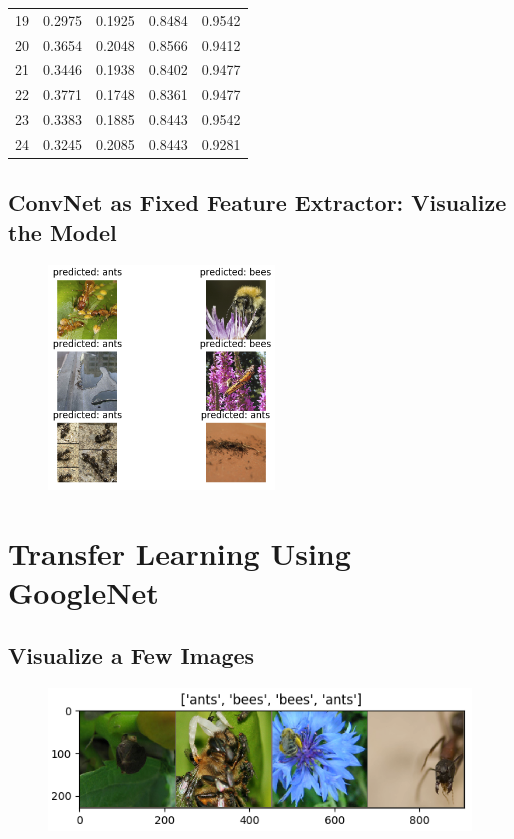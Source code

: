 \documentclass[12pt]{article}
\begin{document}
\begin{table}[h]
{\begin{tabular}{lcccc}
					19    & 0.2975     & 0.1925           & 0.8484         & 0.9542              \\
					20    & 0.3654     & 0.2048           & 0.8566         & 0.9412              \\
					21    & 0.3446     & 0.1938           & 0.8402         & 0.9477              \\
					22    & 0.3771     & 0.1748           & 0.8361         & 0.9477              \\
					23    & 0.3383     & 0.1885           & 0.8443         & 0.9542              \\
					24    & 0.3245     & 0.2085           & 0.8443         & 0.9281              \\ \hline
				\end{tabular}
			}
			\end{table}
		
		
		\subsection{ConvNet as Fixed Feature Extractor: Visualize the Model}
		
			\begin{figure}[h]
				\centering
				\includegraphics[width=6cm]{Figure_3.png}
				\captionsetup{justification=centering,margin=1cm}
				\label{fig:sub1}
			\end{figure}
		
	\newpage
	
	
	\section{Transfer Learning Using GoogleNet}
	\subsection{Visualize a Few Images}
	
	\begin{figure}[h]
		\centering
		\includegraphics[width=12cm]{Figure_4.png}
		\label{fig:sub1}
	\end{figure}
	
\end{document}
